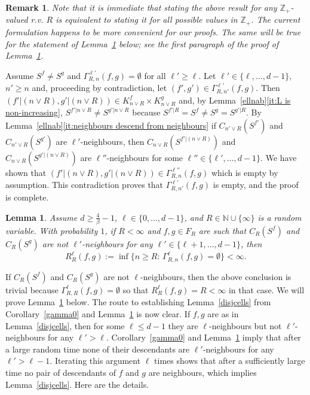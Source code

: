 \documentclass[12pt]{article}
\makeatletter
\renewenvironment{proof}[1][\proofname]{%
\par\pushQED{\qed}\normalfont%
\topsep6\p@\@plus6\p@\relax
\trivlist\item[\hskip\labelsep\bfseries#1\@addpunct{.}]%
\ignorespaces
}{%
\popQED\endtrivlist\@endpefalse
}
\numberwithin{theorem}{section}
\newtheorem{lemma}[theorem]{Lemma}
\newtheorem{remark}[theorem]{Remark}
\theoremstyle{def}
\numberwithin{equation}{section}
\newcommand{\Z}{\mathbb{Z}}
\newcommand{\N}{\mathbb{N}}
\makeatother
\begin{document}
\begin{remark}	
Note that it is immediate that stating the above result for any $\Z_+$-valued r.v. $R$ is equivalent to stating it for all possible values in $\Z_+$. 
The current formulation happens to be more convenient for our proofs. 
The same will be true for the statement of Lemma~\ref{gammaext} below; see the first paragraph of the proof of Lemma~\ref{gammaext}.
\end{remark}

\begin{proof}[Proof of Corollary~\ref{gamma0}]
	 Assume $S^f\neq S^g$ and $\Gamma_{R,n}^{\ell'}(f,g)=\emptyset$ for all $\ell'\ge \ell$.  
	Let $\ell'\in\{\ell,\dots,d-1\}$, $n'\ge n$ and, proceeding by contradiction, let $(f',g')\in \Gamma^{\ell'}_{R,n'}(f,g)$. 
	Then $(f'|(n\vee R),g'|(n\vee R))\in K^f_{n\vee R}\times K^g_{n\vee R}$ and, by Lemma~\ref{ellnab}\ref{it:L is non-increasing},  $S^{f'|n\vee R}\neq S^{g'|n\vee R}$ because $S^{f'|R}=S^f\neq S^g=S^{g'|R}$. 
	By Lemma~\ref{ellnab}\ref{it:neighbours descend from neighbours} if $C_{n'\vee R}(S^{f'})$ and $C_{n'\vee R}(S^{g'})$ are $\ell'$-neighbours, then $C_{n\vee R}(S^{f'|(n\vee R)})$ and $C_{n\vee R}(S^{g'|(n\vee R)})$ are $\ell''$-neighbours for some $\ell''\in\{\ell',\dots,d-1\}$. 
	We have shown that $(f'|(n\vee R),g'|(n\vee R))\in \Gamma^{\ell''}_{R,n}(f,g)$ which is empty by assumption.  
	This contradiction proves that 
$\Gamma^{\ell'}_{R,n'}(f,g)$ is empty, and the proof is complete.
\end{proof}

\begin{lemma}\label{gammaext}
Assume $d\ge\frac{4}{\beta}-1$, $\ell\in\{0,\dots,d-1\}$, and $R\in\N\cup\{\infty\}$ is a random
variable.
With probability $1$, 
if $R<\infty$ and $f,g\in F_R$ are such that $C_R(S^f)$ and $C_R(S^g)$ are not $\ell'$-neighbours for any $\ell'\in\{\ell+1,\dots,d-1\}$, then 
\begin{equation}\label{Rfinite}R_R^\ell(f,g):=\inf\{n\ge R:\, \Gamma^\ell_{R,n}(f,g)=\emptyset\}<\infty.
\end{equation}
\end{lemma}


If $C_R(S^f)$ and $C_R(S^g)$ are not $\ell$-neighbours, then the above conclusion is  trivial because 
$\Gamma^\ell_{R,R}(f,g)=\emptyset$ so that 
 $R^\ell_R(f,g)=R <\infty$ in that case.  
We will prove Lemma~\ref{gammaext} below. 
The route to establishing Lemma~\ref{disjcells} from Corollary~\ref{gamma0} and Lemma~\ref{gammaext} is now clear.  If
$f,g$ are as in Lemma~\ref{disjcells}, then for some $\ell\le d-1$ they are $\ell$-neighbours but not $\ell'$-neighbours for any $\ell'>\ell$.  Corollary~\ref{gamma0} and Lemma~\ref{gammaext} imply that after a large random time none of their descendants are $\ell'$-neighbours for any $\ell'>\ell-1$.  Iterating this argument $\ell$ times shows that after a sufficiently large time no pair of descendants of $f$ and $g$ are neighbours, which implies Lemma~\ref{disjcells}.  Here are the details.
\end{document}
